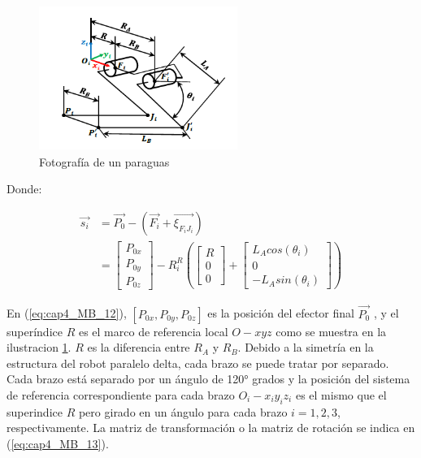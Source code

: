            \begin{figure}[htb]
                 \centering
                 \includegraphics[width=0.4\linewidth]{Main/Chapter4/Images4/Metodo_B_Modelacion_Cinematica_Posicion_5.png}
                  \caption{Fotografía de un paraguas}
                  \label{f:Cap4_Metodo_B_Modelacion_Cinematica_Posicion_5}
            \end{figure}  

        \newpage
        Donde: 
        
    \begin{align}
        \overrightarrow{s_{i}} & = \overrightarrow{P_{0}}- \left(\overrightarrow{F_{i}}+\overrightarrow{\xi_{F_{i}J_{i}}} \right)\\&= 
            \begin{bmatrix}
                P_{0x} \\
                P_{0y} \\
                P_{0z}
            \end{bmatrix} -  R_{i}^{R}
            \left( 
            \begin{bmatrix}
                R \\
                0\\
                0
            \end{bmatrix} + 
            \begin{bmatrix}
                L_{A} cos(\theta_i) \\
                0\\
                -L_{A} sin(\theta_i) 
            \end{bmatrix}
            \right)
        \label{eq:cap4_MB_12}
    \end{align}
    
    En (\ref{eq:cap4_MB_12}), $[P_{0x},P_{0y},P_{0z}]$ es la posición del efector final $\overrightarrow{P_{0}}$ , y el superíndice $R$ es el marco de referencia local $O-xyz$ como se muestra en la ilustracion \ref{f:Cap4_Metodo_B_Modelacion_Cinematica_Posicion_5}. $R$ es la diferencia entre ${R}_{A}$ y ${R}_{B}$.
    Debido a la simetría en la estructura del robot paralelo delta, cada brazo se puede tratar por separado. Cada brazo está separado por un ángulo de 120° grados y la posición del sistema de referencia correspondiente para cada brazo $O_i - x_i y_i z_i$  es el mismo que el superindice $R$ pero girado en un ángulo para cada brazo $i={1,2 ,3}$, respectivamente. 
    La matriz de transformación  o  la  matriz de rotación se indica en (\ref{eq:cap4_MB_13}).
    
